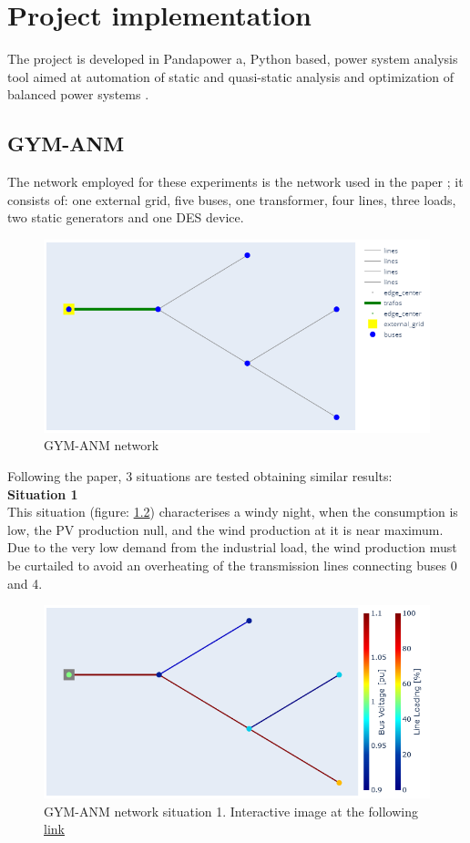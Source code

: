 \chapter{Project implementation}
The project is developed in Pandapower a, Python based, power system analysis tool aimed at automation of static and quasi-static analysis and optimization of balanced power systems \cite{pandapower}.

\section{GYM-ANM}
The network employed for these experiments is the network used in the paper \cite{gym-anm}; it consists of: one external grid, five buses, one transformer, four lines, three loads, two static generators and one \gls{DES} device.

\begin{figure}[h]
\centering
    \includegraphics[width=.7\linewidth]{images/GYM-ANM/NETS/Gyn-anm network.png}
\caption{GYM-ANM network}
\label{fig:gym_anm_net}
\end{figure}

\noindent Following the paper, 3 situations are tested obtaining similar results:\\
\textbf{Situation 1} \\
    This situation (figure: \ref{fig:net_sit1}) characterises a windy night, when the consumption is low, the PV
    production null, and the wind production at it is near maximum. Due to the very low demand from the industrial load, the wind production must be curtailed to avoid an overheating of the transmission lines connecting
    buses 0 and 4.
    \begin{figure}[H]
    \centering
        \includegraphics[width=.7\linewidth]{images/GYM-ANM/NETS/Gyn-anm network situation1.png}
    \caption[GYM-ANM network situation 1]{GYM-ANM network situation 1. Interactive image at the following \href{https://htmlpreview.github.io/?https://github.com/MauriVass/ThesisLiege/blob/master/Images/fig_case1.html}{link}}
    \label{fig:net_sit1}
    \end{figure}
    
